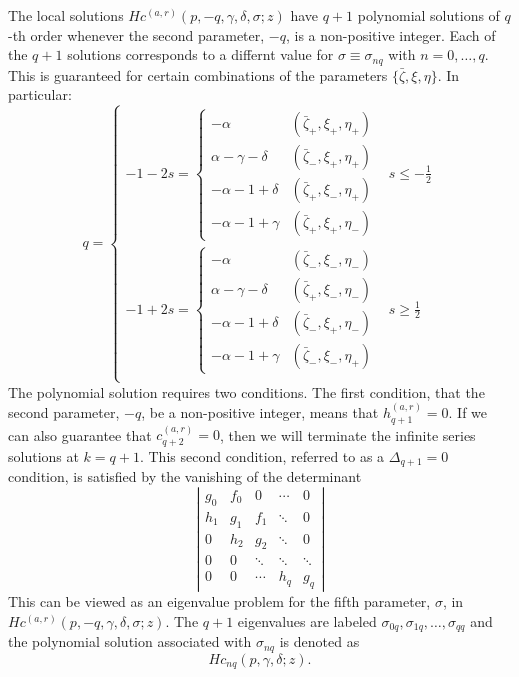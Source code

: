 \documentclass[11pt]{article}
\begin{document}
The local solutions $Hc^{(a,r)}(p,-q,\gamma,\delta,\sigma;z)$ have $q+1$
polynomial solutions of $q$-th order whenever the second parameter,
$-q$, is a non-positive integer.  Each of the $q+1$ solutions
corresponds to a differnt value for $\sigma\equiv\sigma_{nq}$ with
$n=0,\ldots,q$.  This is guaranteed for certain combinations of the
parameters $\{\bar\zeta,\xi,\eta\}$.  In particular:
\begin{equation}
  q= \left\{\begin{array}{lc}
  -1-2s = \left\{\begin{array}{cc}
            -\alpha & (\bar\zeta_+,\xi_+,\eta_+) \\
            \alpha-\gamma-\delta & (\bar\zeta_\minus,\xi_+,\eta_+) \\
            -\alpha-1+\delta & (\bar\zeta_+,\xi_\minus,\eta_+) \\
            -\alpha-1+\gamma & (\bar\zeta_+,\xi_+,\eta_\minus)
  \end{array}\right. & s\le-\frac12 \\
  -1+2s = \left\{\begin{array}{cc}
            -\alpha & (\bar\zeta_\minus,\xi_\minus,\eta_\minus) \\
            \alpha-\gamma-\delta & (\bar\zeta_+,\xi_\minus,\eta_\minus) \\
            -\alpha-1+\delta & (\bar\zeta_\minus,\xi_+,\eta_\minus) \\
            -\alpha-1+\gamma & (\bar\zeta_\minus,\xi_\minus,\eta_+)
  \end{array}\right. & s\ge\frac12 \\
\end{array}\right.
\end{equation}
The polynomial solution requires two conditions.  The first condition,
that the second parameter, $-q$, be a non-positive integer, means that
$h^{(a,r)}_{q+1}=0$.  If we can also guarantee that
$c^{(a,r)}_{q+2}=0$, then we will terminate the infinite series
solutions at $k=q+1$.  This second condition, referred to as a
$\Delta_{q+1}=0$ condition, is satisfied by the vanishing of the
determinant
\begin{equation}
  \left|\begin{array}{ccccc}
  g_0 & f_0 & 0 & \cdots & 0 \\
  h_1 & g_1 & f_1 & \ddots & 0 \\
  0 & h_2 & g_2 & \ddots & 0 \\
  0 & 0 & \ddots & \ddots & \ddots \\
  0 & 0 & \cdots & h_q & g_q
  \end{array}\right|
\end{equation}
This can be viewed as an eigenvalue problem for the fifth parameter,
$\sigma$, in $Hc^{(a,r)}(p,-q,\gamma,\delta,\sigma;z)$.  The $q+1$
eigenvalues are labeled $\sigma_{0q},\sigma_{1q},\ldots,\sigma_{qq}$
and the polynomial solution associated with $\sigma_{nq}$ is denoted
as
\begin{equation}
  Hc_{nq}(p,\gamma,\delta;z).
\end{equation}
\end{document}
